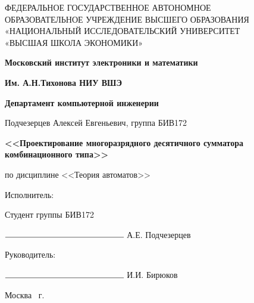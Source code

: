 \begin{titlepage}
	\begin{center}
		ФЕДЕРАЛЬНОЕ  ГОСУДАРСТВЕННОЕ АВТОНОМНОЕ \\
		ОБРАЗОВАТЕЛЬНОЕ УЧРЕЖДЕНИЕ ВЫСШЕГО ОБРАЗОВАНИЯ\\
		«НАЦИОНАЛЬНЫЙ ИССЛЕДОВАТЕЛЬСКИЙ УНИВЕРСИТЕТ\\
		«ВЫСШАЯ ШКОЛА ЭКОНОМИКИ»
	\end{center}
	
	\begin{center}
		\textbf{Московский институт электроники и математики}
		
		\textbf{Им. А.Н.Тихонова НИУ ВШЭ}
		
		\vspace{2ex}
		
		\textbf{Департамент компьютерной инженерии}
	\end{center}
	\vspace{1ex}	
	\begin{center}
		Подчезерцев Алексей Евгеньевич, группа БИВ172
		
	\end{center}	
	\vspace{1ex}
	\begin{center}
		\textbf{<<Проектирование многоразрядного десятичного сумматора
			комбинационного типа>>}
	\end{center}	
	\vspace{2ex}
	\begin{center}
		по дисциплине <<Теория автоматов>>

	\end{center}
	\vspace{2ex}
	\begin{flushright}
		Исполнитель:
		
		Студент группы БИВ172
		
		$\rule{5cm}{0.15mm}$ А.Е. Подчезерцев 
		
	\end{flushright}
	\vspace{3ex}
	\begin{flushright}
		Руководитель:
		
		$\rule{5cm}{0.15mm}$ И.И. Бирюков
	\end{flushright}
	\vfill
	\begin{center}
		Москва \the\year \, г.
	\end{center}
\end{titlepage}